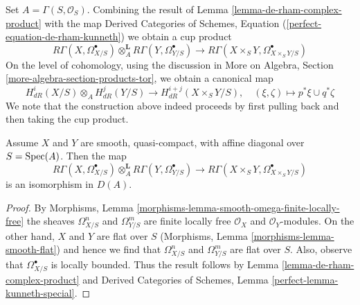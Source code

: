\noindent
Set $A = \Gamma(S, \mathcal{O}_S)$. Combining the result of
Lemma \ref{lemma-de-rham-complex-product} with the map
Derived Categories of Schemes, Equation
(\ref{perfect-equation-de-rham-kunneth})
we obtain a cup product
$$
R\Gamma(X, \Omega^\bullet_{X/S})
\otimes_A^\mathbf{L}
R\Gamma(Y, \Omega^\bullet_{Y/S})
\longrightarrow
R\Gamma(X \times_S Y, \Omega^\bullet_{X \times_S Y/S})
$$
On the level of cohomology, using the discussion in
More on Algebra, Section \ref{more-algebra-section-products-tor},
we obtain a canonical map
$$
H^i_{dR}(X/S) \otimes_A H^j_{dR}(Y/S)
\longrightarrow
H^{i + j}_{dR}(X \times_S Y/S),\quad
(\xi, \zeta) \longmapsto p^*\xi \cup q^*\zeta
$$
We note that the construction above indeed proceeds by
first pulling back and then taking the cup product.

\begin{lemma}
\label{lemma-kunneth-de-rham}
Assume $X$ and $Y$ are smooth, quasi-compact, with affine diagonal over
$S = \mathop{\mathrm{Spec}}(A)$. Then the map
$$
R\Gamma(X, \Omega^\bullet_{X/S})
\otimes_A^\mathbf{L}
R\Gamma(Y, \Omega^\bullet_{Y/S})
\longrightarrow
R\Gamma(X \times_S Y, \Omega^\bullet_{X \times_S Y/S})
$$
is an isomorphism in $D(A)$.
\end{lemma}

\begin{proof}
By Morphisms, Lemma \ref{morphisms-lemma-smooth-omega-finite-locally-free}
the sheaves $\Omega^n_{X/S}$ and $\Omega^m_{Y/S}$ are finite locally free
$\mathcal{O}_X$ and $\mathcal{O}_Y$-modules. On the other hand, $X$ and $Y$
are flat over $S$ (Morphisms, Lemma \ref{morphisms-lemma-smooth-flat})
and hence we find that $\Omega^n_{X/S}$ and $\Omega^m_{Y/S}$ are flat over $S$.
Also, observe that $\Omega^\bullet_{X/S}$ is locally bounded. Thus
the result follows by Lemma \ref{lemma-de-rham-complex-product} and
Derived Categories of Schemes, Lemma \ref{perfect-lemma-kunneth-special}.
\end{proof}

